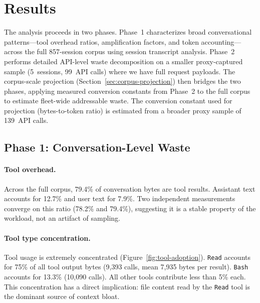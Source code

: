 \section{Results}
\label{sec:results}

The analysis proceeds in two phases. Phase~1 characterizes broad
conversational patterns---tool overhead ratios, amplification factors,
and token accounting---across the full 857-session corpus using session
transcript analysis. Phase~2 performs detailed API-level waste
decomposition on a smaller proxy-captured sample (5~sessions,
99~API calls) where we have full request payloads. The corpus-scale
projection (Section~\ref{sec:corpus-projection}) then bridges the two
phases, applying measured conversion constants from Phase~2 to the
full corpus to estimate fleet-wide addressable waste.
The conversion constant used for projection (bytes-to-token ratio)
is estimated from a broader proxy sample of 139~API calls.

\subsection{Phase 1: Conversation-Level Waste}
\label{sec:phase1}

\paragraph{Tool overhead.}
Across the full corpus, 79.4\% of conversation bytes are tool
results. Assistant text accounts for 12.7\% and user text for
7.9\%. Two independent measurements converge on this ratio
(78.2\% and 79.4\%), suggesting it is a stable property of the
workload, not an artifact of sampling.

\paragraph{Tool type concentration.}
Tool usage is extremely concentrated (Figure~\ref{fig:tool-adoption}).
\texttt{Read} accounts for 75\% of all tool output bytes (9{,}393
calls, mean 7{,}935 bytes per result). \texttt{Bash} accounts for
13.3\% (10{,}090 calls). All other tools contribute less than 5\%
each. This concentration has a direct implication: file content
read by the \texttt{Read} tool is the dominant source of
context bloat.

